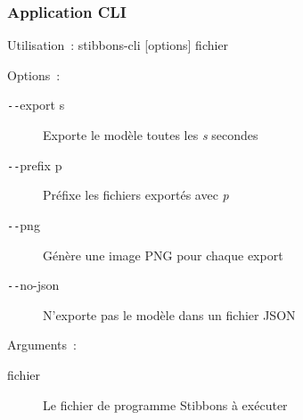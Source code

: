 \begin{frame}
\frametitle{Application CLI}

Utilisation~: stibbons-cli [options] fichier

Options~:
\begin{description}
	\item[\texttt{-{}-}export s] Exporte le modèle toutes les \emph{s} secondes
	\item[\texttt{-{}-}prefix p] Préfixe les fichiers exportés avec \emph{p}
	\item[\texttt{-{}-}png] Génère une image PNG pour chaque export
	\item[\texttt{-{}-}no-json] N'exporte pas le modèle dans un fichier JSON
\end{description}

Arguments~:
\begin{description}
	\item[fichier] Le fichier de programme Stibbons à exécuter
\end{description}

\end{frame}


